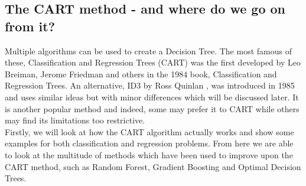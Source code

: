 \documentclass[11pt,a4paper]{report}
\begin{document}
\subsection{The CART method - and where do we go on from it?}
Multiple algorithms can be used to create a Decision Tree. 
The most famous of these, Classification and Regression Trees (CART) \cite{BreimanDT} was the first developed by Leo Breiman, Jerome Friedman and others in the 1984 book, Classification and Regression Trees.
An alternative, ID3 by Ross Quinlan \cite{Quinlan}, was introduced in 1985 and uses similar ideas but with minor differences which will be discussed later.
It is another popular method and indeed, some may prefer it to CART while others may find its limitations too restrictive.
\medskip\\
Firstly, we will look at how the CART algorithm actually works and show some examples for both classification and regression problems. 
From here we are able to look at the multitude of methods which have been used to improve upon the CART method, such as Random Forest, Gradient Boosting and Optimal Decision Trees.
\end{document}
